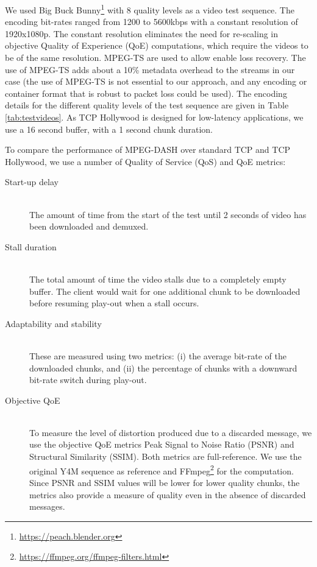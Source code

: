 We used Big Buck Bunny\footnote{\url{https://peach.blender.org}} with 8 quality levels as a video 
test sequence. The encoding bit-rates ranged from 1200 to 5600kbps with a constant resolution of 
1920x1080p. The constant resolution eliminates the need for re-scaling in objective Quality of 
Experience (QoE)
computations, which require the videos to be of the same resolution. MPEG-TS
are used to allow enable loss recovery. The use of MPEG-TS adds about a
10\% metadata overhead to the streams in our case (the use of MPEG-TS is not
essential to our approach, and any encoding or container format that is robust to packet loss
could be used). The encoding details for the different quality levels of
the test sequence are given in Table \ref{tab:testvideos}.
As TCP Hollywood is designed for low-latency applications, we use a 16 second buffer, with
a 1 second chunk duration.

To compare the performance of MPEG-DASH over standard TCP and TCP Hollywood, we use a number of 
Quality of Service (QoS) and QoE metrics: 
\begin{description}
    \item[Start-up delay] \hfill \\
        The amount of time from the start of the test until 2 seconds of video has been downloaded and demuxed.
    \item[Stall duration] \hfill \\
        The total amount of time the video stalls due to a completely empty buffer. The
        client would wait for one additional chunk to be downloaded before resuming play-out
        when a stall occurs.
    \item[Adaptability and stability] \hfill \\
        These are measured using two metrics: (i) the average bit-rate of the downloaded
        chunks, and (ii) the percentage of chunks with a downward bit-rate switch during
        play-out.
    \item[Objective QoE] \hfill \\
        To measure the level of distortion produced due to a discarded message, we use the 
        objective QoE metrics Peak Signal to Noise Ratio (PSNR) and Structural Similarity
        (SSIM). Both metrics are full-reference. We use the original Y4M sequence as
        reference and FFmpeg\footnote{\url{https://ffmpeg.org/ffmpeg-filters.html}} for the
        computation. Since PSNR and SSIM values will be lower for lower quality chunks, the
        metrics also provide a measure of quality even in the absence of discarded messages.
\end{description}



